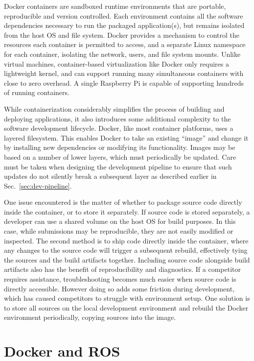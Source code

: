 \documentclass[12pt,initial,twoside,maitrise]{dms}
\numberwithin{equation}{section}
\numberwithin{table}{chapter}
\numberwithin{figure}{chapter}
\begin{document}
Docker containers are sandboxed runtime environments that are portable, reproducible and version controlled. Each environment contains all the software dependencies necessary to run the packaged application(s), but remains isolated from the host OS and file system. Docker provides a mechanism to control the resources each container is permitted to access, and a separate Linux namespace for each container, isolating the network, users, and file system mounts. Unlike virtual machines, container-based virtualization like Docker only requires a lightweight kernel, and can support running many simultaneous containers with close to zero overhead. A single Raspberry Pi is capable of supporting hundreds of running containers.

While containerization considerably simplifies the process of building and deploying applications, it also introduces some additional complexity to the software development lifecycle. Docker, like most container platforms, uses a layered filesystem. This enables Docker to take an existing ``image'' and change it by installing new dependencies or modifying its functionality. Images may be based on a number of lower layers, which must periodically be updated. Care must be taken when designing the development pipeline to ensure that such updates do not silently break a subsequent layer as described earlier in Sec.~\ref{sec:dev-pipeline}.

One issue encountered is the matter of whether to package source code directly inside the container, or to store it separately. If source code is stored separately, a developer can use a shared volume on the host OS for build purposes. In this case, while submissions may be reproducible, they are not easily modified or inspected. The second method is to ship code directly inside the container, where any changes to the source code will trigger a subsequent rebuild, effectively tying the sources and the build artifacts together. Including source code alongside build artifacts also has the benefit of reproducibility and diagnostics. If a competitor requires assistance, troubleshooting becomes much easier when source code is directly accessible. However doing so adds some friction during development, which has caused competitors to struggle with environment setup. One solution is to store all sources on the local development environment and rebuild the Docker environment periodically, copying sources into the image.

\section{Docker and ROS}
\end{document}

